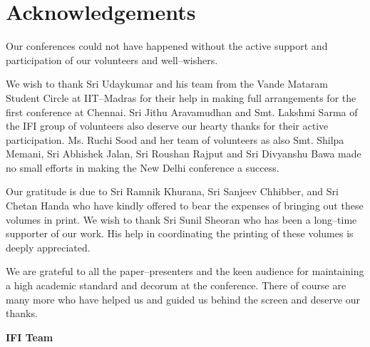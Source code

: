 
\chapter*{Acknowledgements}\label{ack}

Our conferences could not have happened without the active support and participation of our volunteers and well–wishers.

We wish to thank Sri Udaykumar and his team from the Vande Mataram Student Circle at IIT–Madras for their help in making full arrangements for the first conference at Chennai. Sri Jithu Aravamudhan and Smt. Lakshmi Sarma of the IFI group of volunteers also deserve our hearty thanks for their active participation. Ms. Ruchi Sood and her team of volunteers as also Smt. Shilpa Memani, Sri Abhishek Jalan, Sri Roushan Rajput and Sri Divyanshu Bawa made no small efforts in making the New Delhi conference a success.

Our gratitude is due to Sri Ramnik Khurana, Sri Sanjeev Chhibber, and Sri Chetan Handa who have kindly offered to bear the expenses of bringing out these volumes in print. We wish to thank Sri Sunil Sheoran who has been a long–time supporter of our work. His help in coordinating the printing of these volumes is deeply appreciated.

We are grateful to all the paper–presenters and the keen audience for maintaining a high academic standard and decorum at the conference. There of course are many more who have helped us and guided us behind the screen and deserve our thanks.

\begin{flushright}
 \textbf{IFI Team}
\end{flushright}

